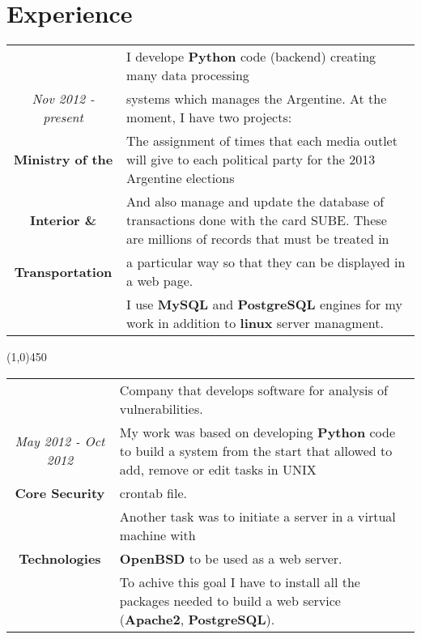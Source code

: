 \section{Experience}

\begin{tabular}{c|p{12.5cm}}
& \large I develope \textbf{Python} code (backend) creating many data processing\\
\large\textit{Nov 2012 - present} &  \large systems which manages the Argentine. At the moment, I have two projects:\\
\large\textbf{Ministry of the} & \large The assignment of times that each media outlet will give to each political party for the 2013 Argentine elections\\
\large\textbf{Interior \&}& \large And also manage and update the database of transactions done with the card SUBE. These are millions of records that must be treated in \\
 \large\textbf{Transportation} & \large a particular way so that they can be displayed in a web page.\\
& \large I use \textbf{MySQL} and \textbf{PostgreSQL} engines for my work in addition to \textbf{linux} server managment.\\
\end{tabular}

\begin{center}
\line(1,0){450}
\end{center}
\begin{tabular}{c|p{12.5cm}}
& \large Company that develops software for analysis of vulnerabilities.\\
\large\textit{May 2012 - Oct 2012} &  \large My work was based on developing \textbf{Python} code to build a system from the start that allowed to add, remove or edit tasks in UNIX\\
\large\textbf{Core Security} & \large  crontab file.\\
 & \large  Another task was to initiate a server in a virtual machine with \\
\large\textbf{Technologies} & \large\textbf{OpenBSD} to be used as a web server. \\
& \large To achive this goal I have to install all the packages needed to build a web service (\textbf{Apache2}, \textbf{PostgreSQL}). \\
\end{tabular}

